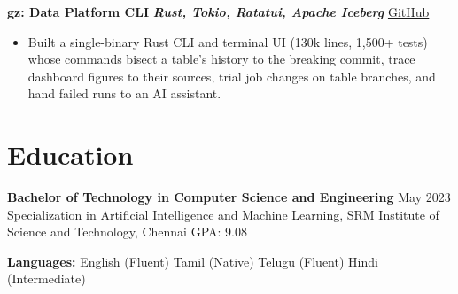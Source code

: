 \documentclass[10pt,letterpaper]{article}
\newcommand{\resumeProject}[3]{
  \textbf{#1} \textbar{} \textbf{\textit{#2}} \hfill #3
}
\begin{document}
\resumeProject{gz: Data Platform CLI}{Rust, Tokio, Ratatui, Apache Iceberg}{\href{https://github.com/Sarvesh-GanesanW/gz-cli}{GitHub}}
\begin{itemize}
  \item Built a single-binary Rust CLI and terminal UI (130k lines, 1,500+ tests) whose commands bisect a table's history to the breaking commit, trace dashboard figures to their sources, trial job changes on table branches, and hand failed runs to an AI assistant.
\end{itemize}

\section*{Education}
\textbf{Bachelor of Technology in Computer Science and Engineering} \hfill May 2023\\
Specialization in Artificial Intelligence and Machine Learning, SRM Institute of Science and Technology, Chennai \hfill GPA: 9.08

\textbf{Languages:} English (Fluent) \textbar{} Tamil (Native) \textbar{} Telugu (Fluent) \textbar{} Hindi (Intermediate)
\end{document}
